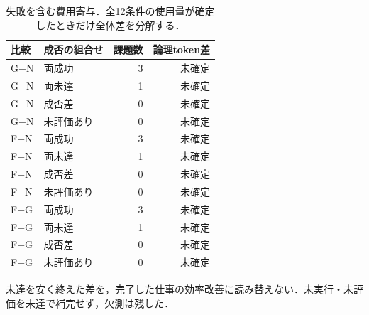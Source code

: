 \begin{table}[tb]
\centering\footnotesize\setlength{\tabcolsep}{3pt}
\caption{失敗を含む費用寄与．全12条件の使用量が確定したときだけ全体差を分解する．}
\begin{tabular}{llrr}
比較 & 成否の組合せ & 課題数 & 論理token差 \\ \hline
G−N & 両成功 & 3 & 未確定 \\
G−N & 両未達 & 1 & 未確定 \\
G−N & 成否差 & 0 & 未確定 \\
G−N & 未評価あり & 0 & 未確定 \\
F−N & 両成功 & 3 & 未確定 \\
F−N & 両未達 & 1 & 未確定 \\
F−N & 成否差 & 0 & 未確定 \\
F−N & 未評価あり & 0 & 未確定 \\
F−G & 両成功 & 3 & 未確定 \\
F−G & 両未達 & 1 & 未確定 \\
F−G & 成否差 & 0 & 未確定 \\
F−G & 未評価あり & 0 & 未確定 \\
\hline\end{tabular}
\end{table}
未達を安く終えた差を，完了した仕事の効率改善に読み替えない．未実行・未評価を未達で補完せず，欠測は残した．
